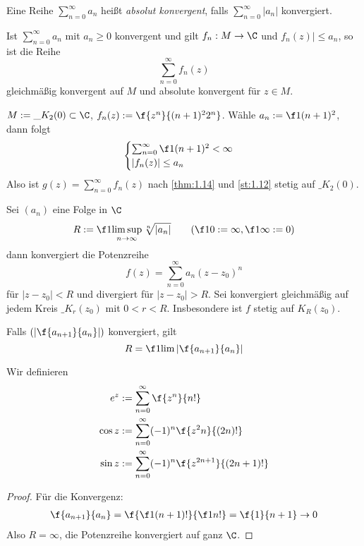 \documentclass[a4paper,10pt]{scrartcl}
\begin{document}
\begin{df}
	\label{df:1.13}
	Eine Reihe $\sum_{n=0}^\infty a_n$ heißt \emph{absolut konvergent}, falls $\sum_{n=0}^\infty |a_n|$ konvergiert.
\end{df}

\begin{thm}
	\label{thm:1.14}
	Ist $\sum_{n=0}^\infty a_n$ mit $a_n \ge 0$ konvergent und gilt $f_n:M\to \C$ und $f_n(z)| \le a_n$, so ist die Reihe
	\[
		\sum_{n=0}^\infty f_n(z)
	\]
	gleichmäßig konvergent auf $M$ und absolute konvergent für $z\in M$.
\end{thm}

\begin{ex}
	$M:= \_{K_2(0)} \subset \C$, $f_n(z) := \f {z^n}{(n+1)^22^n}$.
	Wähle $a_n:= \f 1{(n+1)^2}$, dann folgt
	\[
		\begin{cases}
			\sum_{n=0}^\infty \f 1{(n+1)^2} < \infty \\
			|f_n(z)| \le a_n
		\end{cases}
	\]
	Also ist $g(z) = \sum_{n=0}^\infty f_n(z)$ nach \ref{thm:1.14} und \ref{st:1.12} stetig auf $\_{K_2(0)}$.
\end{ex}

\begin{df}[Potenzreihen]
	Sei $(a_n)$ eine Folge in $\C$
	\[
		R := \f 1{\limsup_{n\to \infty}\sqrt[n]{|a_n|}} \qquad (\f 10 := \infty, \f 1\infty := 0)
	\]
	dann konvergiert die Potenzreihe
	\[
		f(z) = \sum_{n=0}^\infty a_n(z-z_0)^n
	\]
	für $|z-z_0|<R$ und divergiert für $|z-z_0|>R$.
	Sei konvergiert gleichmäßig auf jedem Kreis $\_{K_r(z_0)}$ mit $0<r<R$.
	Insbesondere ist $f$ stetig auf $K_R(z_0)$.

	Falls $(|\f {a_{n+1}}{a_n}|)$ konvergiert, gilt
	\[
		R = \f 1{\lim |\f{a_{n+1}}{a_n}|}
	\]
\end{df}

\begin{df}
	Wir definieren
	\begin{align*}
		e^z &:= \sum_{n=0}^\infty \f {z^n}{n!}\\
		\cos z &:= \sum_{n=0}^\infty (-1)^n \f {z^2n}{(2n)!} \\
		\sin z &:= \sum_{n=0}^\infty (-1)^n \f{z^{2n+1}}{(2n+1)!}
	\end{align*}
	\begin{proof}
		Für die Konvergenz:
		\begin{align*}
			\f {a_{n+1}}{a_n} = \f {\f1{(n+1)!}}{\f 1{n!}} = \f {1}{n+1} \to 0
		\end{align*}
		Also $R=\infty$, die Potenzreihe konvergiert auf ganz $\C$.		
	\end{proof}
\end{df}
\end{document}
